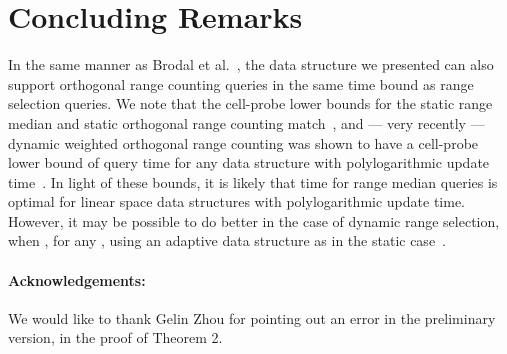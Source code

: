 \documentclass{llncs}
\begin{document}
\section{Concluding Remarks}
In the same manner as Brodal et al.~\cite{BGJS10}, the data structure
we presented can also support orthogonal range counting queries in the
same time bound as range selection queries.  We note that the
cell-probe lower bounds for the static range median and static
orthogonal range counting match~\cite{P07,JL11}, and --- very recently
--- dynamic weighted orthogonal range counting was shown to have a
cell-probe lower bound of  query time
for any data structure with polylogarithmic update time~\cite{L11}.
In light of these bounds, it is likely that 
time for range median queries is optimal for linear space data
structures with polylogarithmic update time.  However, it may be
possible to do better in the case of dynamic range selection, when , for any , using an adaptive data
structure as in the static case~\cite{JL11}.

\paragraph{Acknowledgements:} We would like to thank Gelin Zhou for
pointing out an error in the preliminary version, in the proof of
Theorem 2.

 
\end{document}
